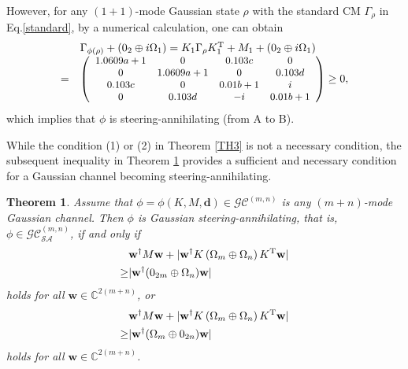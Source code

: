\documentclass[10pt,aps,pra,amsfonts,amssymb,amsmath,%
floatfix,nofootinbib, groupedaddress,superscriptaddress,citesort,twocolumn
]{revtex4}%
\newtheorem{theorem}{Theorem}
\begin{document}
However, for any  $(1+1)$-mode Gaussian state $\rho$ with the standard CM    $\Gamma_\rho$ in Eq.\eqref{standard},
by a numerical calculation,	one can obtain
	\[\begin{array}{rl}
	&\Gamma_{\phi(\rho)}+\left( {{0_2} \oplus i{\Omega _1}} \right)=
	{K_1}\Gamma _\rho K_1^{\rm T} + {M_1} + \left( {{0_2} \oplus i{\Omega _1}} \right)\\
		=& {\small\left( {\begin{array}{*{20}{c}}
				{1.0609a+1}&0&{0.103c}&0\\
				0&{1.0609a + 1}&0&{0.103d}\\
				{0.103c}&0&{0.01b + 1}&i\\
				0&{0.103d}&{ - i}&{0.01b + 1}
		\end{array}} \right)}
		\ge 0,
	\end{array}\]
	which implies that $\phi$ is steering-annihilating (from A to B).
	
 
While  the condition (1) or (2)   in Theorem \ref{TH3} is not  a necessary condition, the subsequent  inequality in Theorem \ref{TH301} provides a sufficient and necessary condition for  a Gaussian channel becoming steering-annihilating.
 

\begin{theorem}  \label{TH301}   Assume that  $\phi =\phi\left( {K,M,\mathbf d} \right) \in {\mathcal {GC}}^{(m,n)}$ is any $(m+n)$-mode Gaussian channel. Then $\phi$ is Gaussian  steering-annihilating, that is, $\phi  \in  {\mathcal {GC}}^{(m,n)}_{\mathcal {SA}} $, if and only if 
\begin{equation}\label{N61}
\begin{aligned}
	&	\mathbf{w}^{\dag}M\mathbf{w} +|\mathbf{w}^{\dag}K\left( \Omega_{m} \oplus \Omega _n \right){K^{\rm T}}\mathbf{w}|\\
		\ge& |\mathbf{w}^{\dag}({0_{2m}} \oplus {\Omega _n})\mathbf{w}|
\end{aligned}	
\end{equation}
holds for  all $\mathbf{w} \in \mathbb{C}^{2(m+n)}$, 
 or 
\begin{equation}\label{N611}
		\begin{aligned}
			&	\mathbf{w}^{\dag}M\mathbf{w} +|\mathbf{w}^{\dag}K\left( \Omega_{m} \oplus \Omega _n \right){K^{\rm T}}\mathbf{w}|\\
			\ge& |\mathbf{w}^{\dag}( {\Omega _m} \oplus{0_{2n}})\mathbf{w}|
		\end{aligned}	
\end{equation}
holds for  all $\mathbf{w} \in \mathbb{C}^{2(m+n)}$. 
\end{theorem}	
\end{document}
